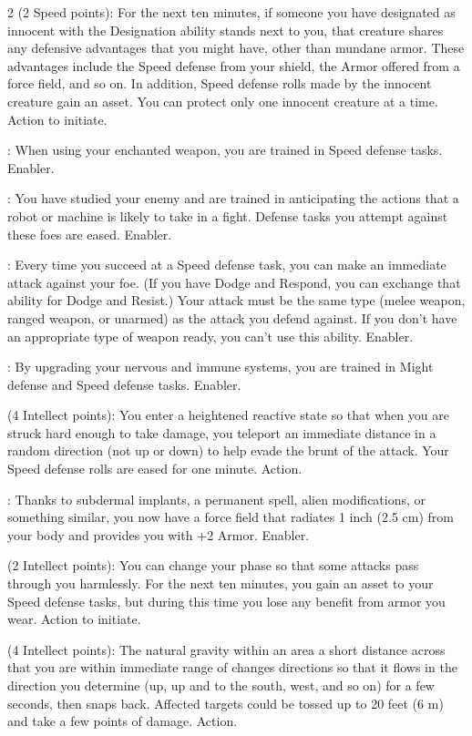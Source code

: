 \begin{multicols}{2}
 (2 Speed points): For the next ten minutes, if someone you have designated as innocent with the Designation ability stands next to you, that creature shares any defensive advantages that you might have, other than mundane armor. These advantages include the Speed defense from your shield, the Armor offered from a force field, and so on. In addition, Speed defense rolls made by the innocent creature gain an asset. You can protect only one innocent creature at a time. Action to initiate. 

: When using your enchanted weapon, you are trained in Speed defense tasks. Enabler. 

: You have studied your enemy and are trained in anticipating the actions that a robot or machine is likely to take in a fight. Defense tasks you attempt against these foes are eased. Enabler. 

: Every time you succeed at a Speed defense task, you can make an immediate attack against your foe. (If you have Dodge and Respond, you can exchange that ability for Dodge and Resist.) Your attack must be the same type (melee weapon, ranged weapon, or unarmed) as the attack you defend against. If you don’t have an appropriate type of weapon ready, you can’t use this ability. Enabler. 

: By upgrading your nervous and immune systems, you are trained in Might defense and Speed defense tasks. Enabler. 

 (4 Intellect points): You enter a heightened reactive state so that when you are struck hard enough to take damage, you teleport an immediate distance in a random direction (not up or down) to help evade the brunt of the attack. Your Speed defense rolls are eased for one minute. Action.

: Thanks to subdermal implants, a permanent spell, alien modifications, or something similar, you now have a force field that radiates 1 inch (2.5 cm) from your body and provides you with +2 Armor. Enabler. 

 (2 Intellect points): You can change your phase so that some attacks pass through you harmlessly. For the next ten minutes, you gain an asset to your Speed defense tasks, but during this time you lose any benefit from armor you wear. Action to initiate. 

 (4 Intellect points): The natural gravity within an area a short distance across that you are within immediate range of changes directions so that it flows in the direction you determine (up, up and to the south, west, and so on) for a few seconds, then snaps back. Affected targets could be tossed up to 20 feet (6 m) and take a few points of damage. Action. 


\end{multicols}
